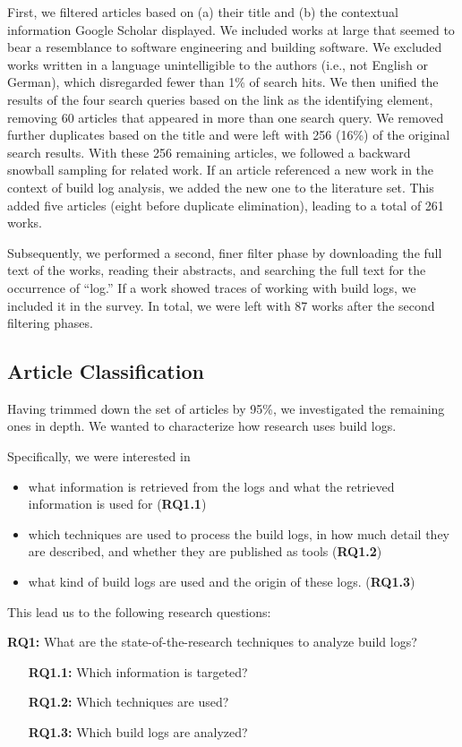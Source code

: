First, we filtered articles based on (a) their title and (b) the
contextual information Google Scholar displayed.
We included works at large that seemed to bear a resemblance to software
engineering and building software.
We excluded works written in a language unintelligible to the authors
(i.e., not English or German), which disregarded fewer than 1\% of search
hits.
We then unified
the results of the four search queries based on the link as the
identifying element, removing 60 articles that appeared in more than
one search query.
We removed further duplicates based on the title and were
left with 256 (16\%) of the original search results.
With these 256 remaining articles, we followed a backward snowball
sampling for related work.
If an article referenced a new work in the context
of build log analysis, we added the new one to the literature set.
This added five articles (eight before
duplicate elimination), leading to a total of 261
works.

Subsequently, we performed a second, finer filter phase by downloading the
full text of the works, reading their abstracts, and searching the
full text
for the occurrence of ``log.''
If a work showed traces of
working with build logs, we included it in the survey.
In total, we
were left with 87 works after the second filtering phases.

\subsection{Article Classification}
Having trimmed down the set of articles by 95\%, we investigated the
remaining ones in depth.
We wanted to characterize how research uses build logs.

Specifically, we were interested in
\begin{itemize}
  \item what information is retrieved from the logs and
  what the retrieved information is used for (\textbf{RQ1.1})
  \item which techniques are used to process the build logs,
  in how much detail they are described, and whether they are published
  as tools (\textbf{RQ1.2})
  \item what kind of build logs are used and the origin of these
  logs.
(\textbf{RQ1.3})
\end{itemize}

This lead us to the following research questions:
\begin{simplebox}[attach boxed title to top center={yshift=-6mm}]
{\textbf{RQ1:} What are the state-of-the-research
techniques to analyze build logs?}
\begin{itemize}[leftmargin=2cm]
  \item[\textbf{RQ1.1:}] Which information is targeted?
  \item[\textbf{RQ1.2:}] Which techniques are used?
  \item[\textbf{RQ1.3:}] Which build logs are analyzed?
\end{itemize}
\end{simplebox}

